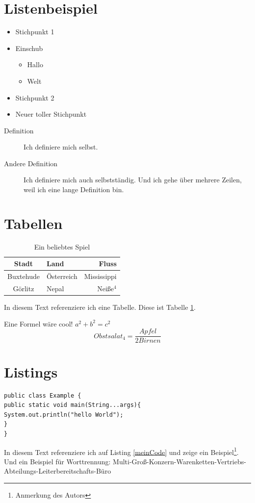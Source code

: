 \documentclass[]{scrreprt}
\begin{document}
\section{Listenbeispiel}

\begin{itemize}
\item Stichpunkt 1
\item Einschub
\begin{itemize}
\item Hallo
\item Welt
\end{itemize}

\item Stichpunkt 2
\item Neuer toller Stichpunkt
\end{itemize}

\begin{description}
\item [Definition] Ich definiere mich selbst.
\item [Andere Definition] Ich definiere mich auch selbstständig. Und ich gehe über mehrere Zeilen, weil ich eine lange Definition bin.
\end{description}

\section{Tabellen}

\begin{table}[h]
\centering
\begin{tabular}{|c||l|r|}
\hline
Stadt & Land & Fluss \\
\hline
Buxtehude & Österreich & Mississippi\\
\hline
Görlitz & Nepal & Neiße$^4$\\
\hline
\end{tabular}
\caption{Ein beliebtes Spiel}
\label{tab:stadt}
\end{table}

In diesem Text referenziere ich eine Tabelle. Diese ist Tabelle \ref{tab:stadt}.

Eine Formel wäre cool! $a^2 + b^2 = c^2$
\[ Obstsalat_4 = \frac{Apfel}{2 Birnen} \]

\section{Listings}

\begin{lstlisting}[caption=Example, label=meinCode]
public class Example {
public static void main(String...args){
System.out.println("hello World");
}
}
\end{lstlisting}


In diesem Text referenziere ich auf Listing \ref{meinCode} und zeige ein Beispiel\footnote{Anmerkung des Autors}. Und ein Beispiel für Worttrennung: Multi-Groß-Konzern-Warenketten-Vertriebs-Abteilungs-Leiterbereit\-schafts-Büro
\end{document}
